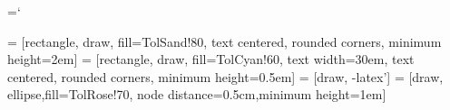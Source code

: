 \usepackage{linguex}
\usepackage{soul}
\usepackage{pgfplots}
\pgfplotsset{compat=newest}
\usetikzlibrary{shapes,arrows}

\oneandonehalfspacing


\frenchspacing

%
%
% 
% 
% 



%


\newcommand{\latexe}{{\LaTeX\kern.125em2%
                      \lower.5ex\hbox{$\varepsilon$}}}

\newcommand{\amslatex}{\AmS-\LaTeX{}}

\chardef\bslash=`\\	%

\newcommand{\cn}[1]{\texttt{\bslash #1}}

\makeatletter		%
\def\square{\RIfM@\bgroup\else$\bgroup\aftergroup$\fi
  \vcenter{\hrule\hbox{\vrule\@height.6em\kern.6em\vrule}%
                                              \hrule}\egroup}
\makeatother		%

\nobibliography*


\setcounter{secnumdepth}{3}    %
\setcounter{tocdepth}{1} %

 = [rectangle, draw, fill=TolSand!80, text centered, rounded corners, minimum height=2em]
 = [rectangle, draw, fill=TolCyan!60,
    text width=30em, text centered, rounded corners, minimum height=0.5em]
 = [draw, -latex']
 = [draw, ellipse,fill=TolRose!70, node distance=0.5cm,minimum height=1em]


\usepackage{hyphenat}

